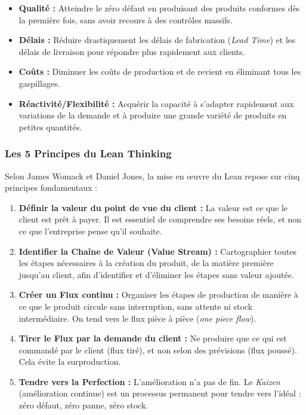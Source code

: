 \documentclass[a4paper,12pt]{article}
\begin{document}
\begin{itemize}
    \item \textbf{Qualité :} Atteindre le \og zéro défaut \fg{} en produisant des produits conformes dès la première fois, sans avoir recours à des contrôles massifs.
    \item \textbf{Délais :} Réduire drastiquement les délais de fabrication (\textit{Lead Time}) et les délais de livraison pour répondre plus rapidement aux clients.
    \item \textbf{Coûts :} Diminuer les coûts de production et de revient en éliminant tous les gaspillages.
    \item \textbf{Réactivité/Flexibilité :} Acquérir la capacité à s'adapter rapidement aux variations de la demande et à produire une grande variété de produits en petites quantités.
\end{itemize}

\subsubsection{Les 5 Principes du Lean Thinking}

Selon James Womack et Daniel Jones, la mise en œuvre du Lean repose sur cinq principes fondamentaux :

\begin{enumerate}
    \item \textbf{Définir la valeur du point de vue du client :} La valeur est ce que le client est prêt à payer. Il est essentiel de comprendre ses besoins réels, et non ce que l'entreprise pense qu'il souhaite.
    \item \textbf{Identifier la Chaîne de Valeur (Value Stream) :} Cartographier toutes les étapes nécessaires à la création du produit, de la matière première jusqu'au client, afin d'identifier et d'éliminer les étapes sans valeur ajoutée.
    \item \textbf{Créer un Flux continu :} Organiser les étapes de production de manière à ce que le produit circule sans interruption, sans attente ni stock intermédiaire. On tend vers le flux pièce à pièce (\textit{one piece flow}).
    \item \textbf{Tirer le Flux par la demande du client :} Ne produire que ce qui est commandé par le client (flux tiré), et non selon des prévisions (flux poussé). Cela évite la surproduction.
    \item \textbf{Tendre vers la Perfection :} L'amélioration n'a pas de fin. Le \textit{Kaizen} (amélioration continue) est un processus permanent pour tendre vers l'idéal : zéro défaut, zéro panne, zéro stock.
\end{enumerate}
\end{document}
